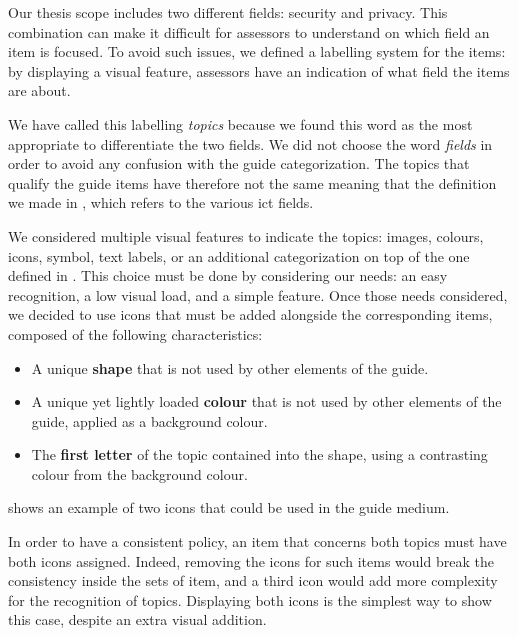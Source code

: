 Our thesis scope includes two different fields: security and privacy. This combination can make it difficult for assessors to understand on which field an item is focused. To avoid such issues, we defined a labelling system for the items: by displaying a visual feature, assessors have an indication of what field the items are about.

We have called this labelling \textit{topics} because we found this word as the most appropriate to differentiate the two fields. We did not choose the word \textit{fields} in order to avoid any confusion with the guide categorization. The topics that qualify the guide items have therefore not the same meaning that the definition we made in , which refers to the various \gls{ict} fields.

We considered multiple visual features to indicate the topics: images, colours, icons, symbol, text labels, or an additional categorization on top of the one defined in . This choice must be done by considering our needs: an easy recognition, a low visual load, and a simple feature. Once those needs considered, we decided to use icons that must be added alongside the corresponding items, composed of the following characteristics:
\begin{itemize}
    \item A unique \textbf{shape} that is not used by other elements of the guide.
    \item A unique yet lightly loaded \textbf{colour} that is not used by other elements of the guide, applied as a background colour.
    \item The \textbf{first letter} of the topic contained into the shape, using a contrasting colour from the background colour.
\end{itemize}

 shows an example of two icons that could be used in the guide medium.


In order to have a consistent policy, an item that concerns both topics must have both icons assigned. Indeed, removing the icons for such items would break the consistency inside the sets of item, and a third icon would add more complexity for the recognition of topics. Displaying both icons is the simplest way to show this case, despite an extra visual addition.

